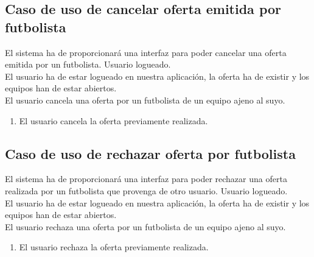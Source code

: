 \subsection{Caso de uso de cancelar oferta emitida por futbolista}
 El sistema ha de proporcionará una interfaz
para poder cancelar una oferta emitida por un futbolista.
 Usuario logueado. \\
 El usuario ha de estar logueado en
nuestra aplicación, la oferta ha de existir y los equipos han de estar
abiertos. \\
 El usuario cancela una oferta por un
futbolista de un equipo ajeno al suyo.
\begin{enumerate}
  \item El usuario cancela la oferta previamente realizada.
\end{enumerate}

\subsection{Caso de uso de rechazar oferta por futbolista}
 El sistema ha de proporcionará una interfaz
para poder rechazar una oferta realizada por un futbolista que
provenga de otro usuario.
 Usuario logueado. \\
 El usuario ha de estar logueado en
nuestra aplicación, la oferta ha de existir y los equipos han de estar
abiertos. \\
 El usuario rechaza una oferta por un
futbolista de un equipo ajeno al suyo.
\begin{enumerate}
  \item El usuario rechaza la oferta previamente realizada.
\end{enumerate}

